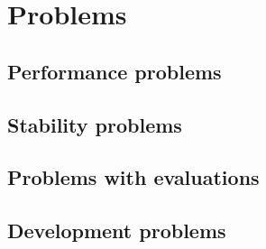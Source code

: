 \section{Problems}\label{sec:problems}

\subsection{Performance problems}

\subsection{Stability problems}

\subsection{Problems with evaluations}

\subsection{Development problems}

